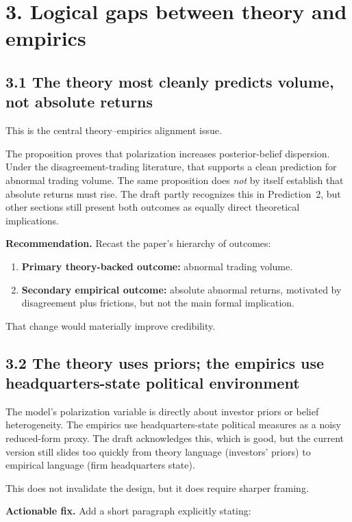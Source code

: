 \documentclass[11pt]{article}
\begin{document}
\section*{3. Logical gaps between theory and empirics}

\subsection*{3.1 The theory most cleanly predicts volume, not absolute returns}

This is the central theory--empirics alignment issue.

The proposition proves that polarization increases posterior-belief dispersion. Under the disagreement-trading literature, that supports a clean prediction for abnormal trading volume. The same proposition does \emph{not} by itself establish that absolute returns must rise. The draft partly recognizes this in Prediction~2, but other sections still present both outcomes as equally direct theoretical implications.

\textbf{Recommendation.} Recast the paper's hierarchy of outcomes:

\begin{enumerate}[leftmargin=1.5em]
    \item \textbf{Primary theory-backed outcome:} abnormal trading volume.
    \item \textbf{Secondary empirical outcome:} absolute abnormal returns, motivated by disagreement plus frictions, but not the main formal implication.
\end{enumerate}

That change would materially improve credibility.

\subsection*{3.2 The theory uses priors; the empirics use headquarters-state political environment}

The model's polarization variable is directly about investor priors or belief heterogeneity. The empirics use headquarters-state political measures as a noisy reduced-form proxy. The draft acknowledges this, which is good, but the current version still slides too quickly from theory language (investors' priors) to empirical language (firm headquarters state).

This does not invalidate the design, but it does require sharper framing.

\textbf{Actionable fix.} Add a short paragraph explicitly stating:
\end{document}
